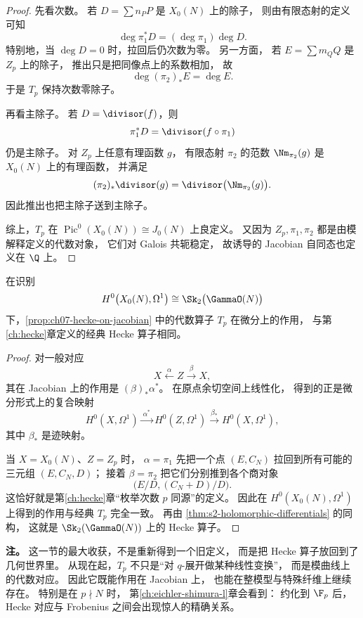 \begin{proof}
先看次数。
若 $D=\sum n_P P$ 是 $X_0(N)$ 上的除子，
则由有限态射的定义可知
\[
  \deg \pi_1^*D=(\deg\pi_1)\deg D.
\]
特别地，当 $\deg D=0$ 时，拉回后仍次数为零。
另一方面，
若 $E=\sum m_Q Q$ 是 $Z_p$ 上的除子，
推出只是把同像点上的系数相加，
故
\[
  \deg (\pi_2)_*E=\deg E.
\]
于是 $T_p$ 保持次数零除子。

再看主除子。
若 $D=\divisor(f)$，则
\[
  \pi_1^*D=\divisor(f\circ \pi_1)
\]
仍是主除子。
对 $Z_p$ 上任意有理函数 $g$，
有限态射 $\pi_2$ 的范数 $\Nm_{\pi_2}(g)$ 是 $X_0(N)$ 上的有理函数，
并满足
\[
  (\pi_2)_*\divisor(g)=\divisor\bigl(\Nm_{\pi_2}(g)\bigr).
\]
因此推出也把主除子送到主除子。

综上，$T_p$ 在 $\operatorname{Pic}^0(X_0(N))\cong J_0(N)$ 上良定义。
又因为 $Z_p,\pi_1,\pi_2$ 都是由模解释定义的代数对象，
它们对 Galois 共轭稳定，
故诱导的 Jacobian 自同态也定义在 $\Q$ 上。
\end{proof}

\begin{proposition}
\label{prop:ch07-algebraic-equals-classical-hecke}
在识别
\[
  H^0\bigl(X_0(N),\Omega^1\bigr)\cong \Sk_2\bigl(\GammaO(N)\bigr)
\]
下，\cref{prop:ch07-hecke-on-jacobian} 中的代数算子 $T_p$
在微分上的作用，
与第\ref{ch:hecke}章定义的经典 Hecke 算子相同。
\end{proposition}

\begin{proof}
对一般对应
\[
  X\xleftarrow{\alpha} Z\xrightarrow{\beta} X,
\]
其在 Jacobian 上的作用是 $(\beta)_*\alpha^*$。
在原点余切空间上线性化，
得到的正是微分形式上的复合映射
\[
  H^0(X,\Omega^1)\xrightarrow{\ \alpha^*\ } H^0(Z,\Omega^1)
  \xrightarrow{\ \beta_*\ } H^0(X,\Omega^1),
\]
其中 $\beta_*$ 是迹映射。

当 $X=X_0(N)$、$Z=Z_p$ 时，
$\alpha=\pi_1$ 先把一个点 $(E,C_N)$ 拉回到所有可能的三元组 $(E,C_N,D)$；
接着 $\beta=\pi_2$ 把它们分别推到各个商对象
\[
  \bigl(E/D,(C_N+D)/D\bigr).
\]
这恰好就是第\ref{ch:hecke}章“枚举次数 $p$ 同源”的定义。
因此在 $H^0(X_0(N),\Omega^1)$ 上得到的作用与经典 $T_p$ 完全一致。
再由 \cref{thm:s2-holomorphic-differentials} 的同构，
这就是 $\Sk_2(\GammaO(N))$ 上的 Hecke 算子。
\end{proof}

\textbf{注。}
这一节的最大收获，不是重新得到一个旧定义，
而是把 Hecke 算子放回到了几何世界里。
从现在起，$T_p$ 不只是“对 $q$-展开做某种线性变换”，
而是模曲线上的代数对应。
因此它既能作用在 Jacobian 上，
也能在整模型与特殊纤维上继续存在。
特别是在 $p\nmid N$ 时，
第\ref{ch:eichler-shimura-l}章会看到：
约化到 $\F_p$ 后，Hecke 对应与 Frobenius 之间会出现惊人的精确关系。

